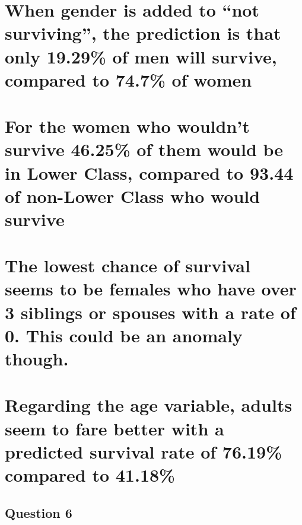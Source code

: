 \documentclass[
]{article}
\begin{document}
\hypertarget{when-gender-is-added-to-not-surviving-the-prediction-is-that-only-19.29-of-men-will-survive-compared-to-74.7-of-women}{%
\section{When gender is added to ``not surviving'', the prediction is
that only 19.29\% of men will survive, compared to 74.7\% of
women}\label{when-gender-is-added-to-not-surviving-the-prediction-is-that-only-19.29-of-men-will-survive-compared-to-74.7-of-women}}

\hypertarget{for-the-women-who-wouldnt-survive-46.25-of-them-would-be-in-lower-class-compared-to-93.44-of-non-lower-class-who-would-survive}{%
\section{For the women who wouldn't survive 46.25\% of them would be in
Lower Class, compared to 93.44 of non-Lower Class who would
survive}\label{for-the-women-who-wouldnt-survive-46.25-of-them-would-be-in-lower-class-compared-to-93.44-of-non-lower-class-who-would-survive}}

\hypertarget{the-lowest-chance-of-survival-seems-to-be-females-who-have-over-3-siblings-or-spouses-with-a-rate-of-0.-this-could-be-an-anomaly-though.}{%
\section{The lowest chance of survival seems to be females who have over
3 siblings or spouses with a rate of 0. This could be an anomaly
though.}\label{the-lowest-chance-of-survival-seems-to-be-females-who-have-over-3-siblings-or-spouses-with-a-rate-of-0.-this-could-be-an-anomaly-though.}}

\hypertarget{regarding-the-age-variable-adults-seem-to-fare-better-with-a-predicted-survival-rate-of-76.19-compared-to-41.18}{%
\section{Regarding the age variable, adults seem to fare better with a
predicted survival rate of 76.19\% compared to
41.18\%}\label{regarding-the-age-variable-adults-seem-to-fare-better-with-a-predicted-survival-rate-of-76.19-compared-to-41.18}}

\hypertarget{question-6}{%
\subsection{Question 6}\label{question-6}}
\end{document}
